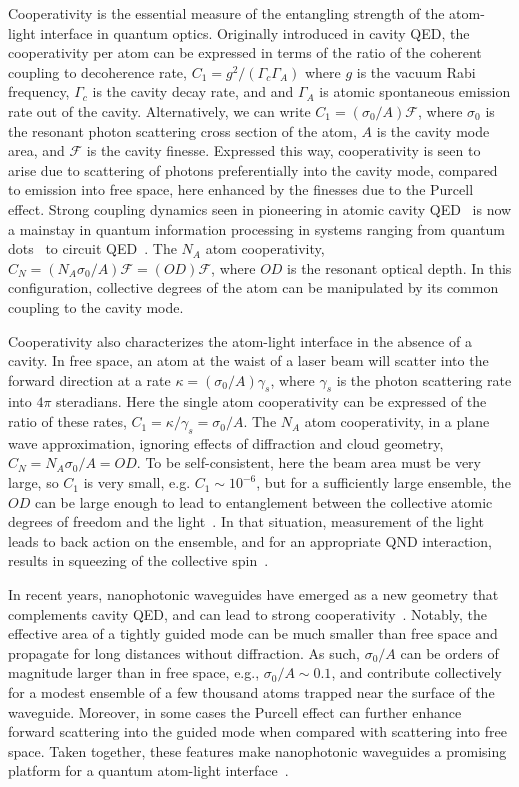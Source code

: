 \documentclass[preprint,aps,pra,onecolumn,superscriptaddress]{revtex4-1} %
\begin{document}
Cooperativity is the essential measure of the entangling strength of the atom-light interface in quantum optics.  Originally introduced in cavity QED, the cooperativity per atom can be expressed in terms of the ratio of the coherent coupling to decoherence rate, $C_1 = g^2/(\Gamma_c \Gamma_A)$ where $g$ is the vacuum Rabi frequency,  $\Gamma_c$ is the cavity decay rate, and and $\Gamma_A$ is atomic spontaneous emission rate out of the cavity.  Alternatively, we can write $C_1 = (\sigma_0/A) \mathcal{F}$, where $\sigma_0$ is the resonant photon scattering cross section of the atom, $A$ is the cavity mode area, and $\mathcal{F}$ is the cavity finesse.  Expressed this way, cooperativity is seen to arise due to scattering of photons preferentially into the cavity mode, compared to emission into free space, here enhanced by the finesses due to the Purcell effect. Strong coupling dynamics seen in pioneering in atomic cavity QED~\cite{?} is now a mainstay in quantum information processing in systems ranging from quantum dots~\cite{?} to circuit QED~\cite{}.  The $N_A$ atom cooperativity, $C_N = (N_A \sigma_0/A) \mathcal{F} =( OD) \mathcal{F}$, where $OD$ is the resonant optical depth.  In this configuration, collective degrees of the atom can be manipulated by its common coupling to the cavity mode.

Cooperativity also characterizes the atom-light interface in the absence of a cavity.  In free space, an atom at the waist of a laser beam will scatter into the forward direction at a rate $\kappa = (\sigma_0/A) \gamma_s$, where $\gamma_s$ is the photon scattering rate into $4 \pi$ steradians.  Here the single atom cooperativity can be expressed of the ratio of these rates, $C_1 = \kappa/\gamma_s = \sigma_0/A$.  The $N_A$ atom cooperativity, in a plane wave approximation, ignoring effects of diffraction and cloud geometry, $C_N = N_A \sigma_0/A = OD$.  To be self-consistent, here the beam area must be very large, so $C_1$ is very small, e.g. $C_1 \sim 10^{-6}$, but for a sufficiently large ensemble, the $OD$ can be large enough to lead to entanglement between the collective atomic degrees of freedom and the light~\cite{?}.  In that situation, measurement of the light leads to back action on the ensemble, and for an appropriate QND interaction, results in squeezing of the collective spin~\cite{?}.

In recent years, nanophotonic waveguides have emerged as a new geometry that complements cavity QED, and can lead to strong cooperativity~\cite{?}.  Notably, the effective area of a tightly guided mode can be much smaller than free space and propagate for long distances without diffraction.  As such,  $\sigma_0/A$ can be orders of magnitude larger than in free space, e.g., $\sigma_0/A \sim 0.1$, and contribute collectively for a modest ensemble of a few thousand atoms trapped near the surface of the waveguide.  Moreover, in some cases the Purcell effect can further enhance forward scattering into the guided mode when compared with scattering into free space.  Taken together, these features make  nanophotonic waveguides a promising platform for a quantum atom-light interface~\cite{?}.
 
\end{document}
